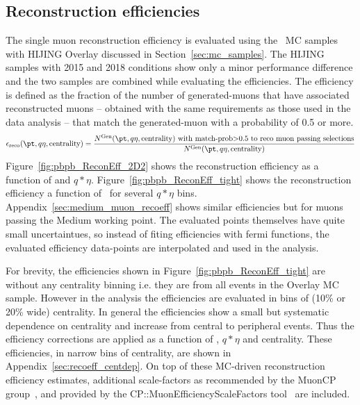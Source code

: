 \clearpage
\subsection{Reconstruction efficiencies\label{sec:reco_eff}}
The single muon reconstruction efficiency is evaluated using the \starlight\
  MC samples~\cite{ATLHI-304,ATLHI-313} with HIJING Overlay 
  discussed in Section~\ref{sec:mc_samples}.
The HIJING samples with 2015 and 2018 conditions show only a 
  minor performance difference and the two samples are combined 
  while evaluating the efficiencies.
The efficiency is defined as the fraction of the number of generated-muons that have
  associated reconstructed muons -- obtained with the same requirements as those
  used in the data analysis -- that match the generated-muon with a probability
  of 0.5 or more.
\begin{align}
\epsilon_{\mathrm{reco}}(\pt,q\eta,\mathrm{centrality}) =\frac{N^{\mathrm{Gen}}(\pt,q\eta,\mathrm{centrality})\text{ with match-prob>0.5 to reco muon passing selections}}{N^{\mathrm{Gen}}(\pt,q\eta,\mathrm{centrality})}
\end{align}
Figure~\ref{fig:pbpb_ReconEff_2D2} shows the reconstruction efficiency
  as a function of \pt and $q*\eta$.
Figure~\ref{fig:pbpb_ReconEff_tight} shows the reconstruction efficiency
  a function of \pT\ for several $q*\eta$ bins.
Appendix~\ref{sec:medium_muon_recoeff} shows similar 
  efficiencies but for muons passing the Medium working point.
The evaluated points themselves have quite small uncertaintues,
  so instead of fiting efficiencies with fermi functions, 
  the evaluated efficiency data-points are interpolated and 
  used in the analysis.

For brevity, the efficiencies shown in Figure~\ref{fig:pbpb_ReconEff_tight} 
  are without any centrality binning i.e. they are from all events in 
  the Overlay MC sample.
However in the analysis the efficiencies are evaluated in bins of 
  (10\% or 20\% wide) centrality.
In general the efficiencies show a small but systematic dependence 
  on centrality and increase from central to peripheral events.
Thus the efficiency corrections are applied as a function of 
  \pt, $q*\eta$ and centrality.
These efficiencies, in narrow bins of centrality, 
  are shown in Appendix~\ref{sec:recoeff_centdep}.
On top of these MC-driven reconstruction efficiency estimates,
  additional scale-factors as recommended by the MuonCP
  group~\cite{MCPAnalysisWinterMC16}, and provided by the
  CP::MuonEfficiencyScaleFactors tool~\cite{MuonEfficiencyScaleFactors}
  are included.

